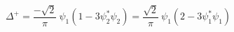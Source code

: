 \begin{equation}
\Delta^+= \frac{-\sqrt{2}}{\pi}~ \psi_1 (1-3 \psi_2^{*} \psi_2)=\frac{\sqrt{2}}{\pi}~ \psi_1 (2-3\psi_1^{*} \psi_1)
\end{equation}

